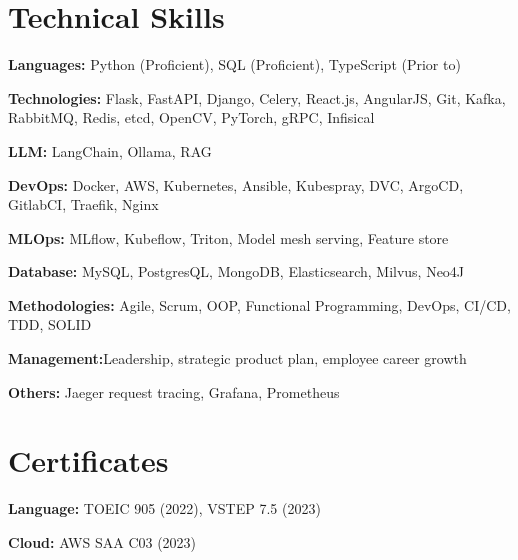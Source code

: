 \documentclass[letterpaper,11pt]{article}
\begin{document}
\section{Technical Skills}
 \begin{itemize}[leftmargin=0.15in, label={}]
    \small{\item{
        \textbf{Languages:}{ Python (Proficient), SQL (Proficient), TypeScript (Prior to)} \\ \vspace{3pt}

        \textbf{Technologies:}{ Flask, FastAPI, Django, Celery, React.js, AngularJS, Git, Kafka, RabbitMQ, Redis, etcd, OpenCV, PyTorch, gRPC, Infisical} \\ \vspace{3pt}

        \textbf{LLM:}{ LangChain, Ollama, RAG}

        \textbf{DevOps:}{ Docker, AWS, Kubernetes, Ansible, Kubespray, DVC, ArgoCD, GitlabCI, Traefik, Nginx} \\ \vspace{3pt}

        \textbf{MLOps:}{ MLflow, Kubeflow, Triton, Model mesh serving, Feature store} \\  \vspace{3pt}

        \textbf{Database:}{  MySQL, PostgresQL, MongoDB, Elasticsearch, Milvus, Neo4J} \\ \vspace{3pt}

        \textbf{Methodologies:}{ Agile, Scrum, OOP, Functional Programming, DevOps, CI/CD, TDD, SOLID} \\ \vspace{3pt}

        \textbf{Management:}{Leadership, strategic product plan, employee career growth} \\ \vspace{3pt}

	\textbf{Others: }{Jaeger request tracing, Grafana, Prometheus} \\ \vspace{3pt}
    }}
 \end{itemize}

\section{Certificates}
 \begin{itemize}[leftmargin=0.15in, label={}]
    \small{\item{
     \textbf{Language:}{ TOEIC 905 (2022), VSTEP 7.5 (2023)} \\ \vspace{3pt}

      \textbf{Cloud:}{ AWS SAA C03 (2023)} \\ \vspace{3pt}

    }}
 \end{itemize}



\end{document}
